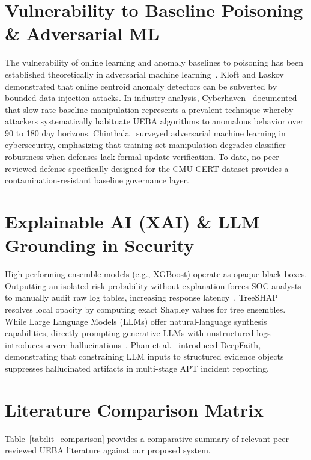 \documentclass[12pt,a4paper]{report}
\begin{document}
\section{Vulnerability to Baseline Poisoning \& Adversarial ML}
The vulnerability of online learning and anomaly baselines to poisoning has been established theoretically in adversarial machine learning~\cite{kloft2012security, biggio2018wild}. Kloft and Laskov demonstrated that online centroid anomaly detectors can be subverted by bounded data injection attacks. In industry analysis, Cyberhaven~\cite{cyberhaven2024anomaly} documented that slow-rate baseline manipulation represents a prevalent technique whereby attackers systematically habituate UEBA algorithms to anomalous behavior over 90 to 180 day horizons. Chinthala~\cite{chinthala2026adversarial} surveyed adversarial machine learning in cybersecurity, emphasizing that training-set manipulation degrades classifier robustness when defenses lack formal update verification. To date, no peer-reviewed defense specifically designed for the CMU CERT dataset provides a contamination-resistant baseline governance layer.

\section{Explainable AI (XAI) \& LLM Grounding in Security}
High-performing ensemble models (e.g., XGBoost) operate as opaque black boxes. Outputting an isolated risk probability without explanation forces SOC analysts to manually audit raw log tables, increasing response latency~\cite{ribeiro2016should}. TreeSHAP~\cite{lundberg2017unified} resolves local opacity by computing exact Shapley values for tree ensembles. While Large Language Models (LLMs) offer natural-language synthesis capabilities, directly prompting generative LLMs with unstructured logs introduces severe hallucinations~\cite{si2024faithlens}. Phan et al.~\cite{phan2026deepfaith} introduced DeepFaith, demonstrating that constraining LLM inputs to structured evidence objects suppresses hallucinated artifacts in multi-stage APT incident reporting.

\section{Literature Comparison Matrix}
Table~\ref{tab:lit_comparison} provides a comparative summary of relevant peer-reviewed UEBA literature against our proposed system.
\end{document}
